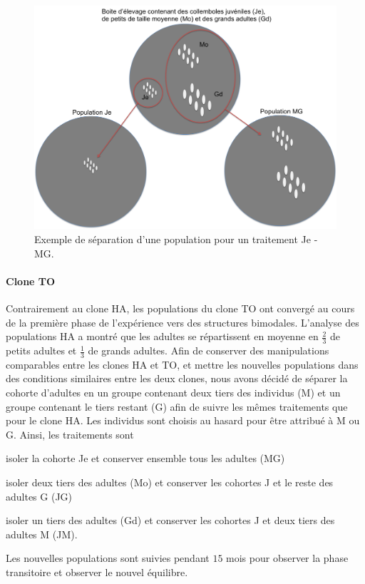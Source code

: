 \begin{figure}[!ht]
\begin{center}
\includegraphics[width=1\textwidth]{1_CorpsDeThese/Resumes/Fig/SM00}
\caption[Exemple de
séparation d'une population]{Exemple de
séparation d'une population pour un traitement Je - MG.}
\label{fig:SM0}
\end{center}
\end{figure}


\paragraph{Clone TO} Contrairement au clone HA, les populations du clone TO ont
convergé au cours de la première phase de l'expérience vers des structures
bimodales. L'analyse des populations HA a montré que les adultes se répartissent
en moyenne en $\frac{2}{3}$ de petits adultes et $\frac{1}{3}$ de grands
adultes. Afin de conserver des manipulations comparables entre les clones HA et
TO, et mettre les nouvelles populations dans des conditions similaires entre les
deux clones, nous avons décidé de séparer la cohorte d'adultes en un groupe
contenant deux tiers des individus (M) et un groupe contenant le tiers restant
(G) afin de suivre les mêmes traitements que pour le clone HA. Les individus
sont choisis au hasard pour être attribué à M ou G.
Ainsi, les traitements sont \begin{enumerate*}[label=(\roman*), before=\unskip{ : }, itemjoin={{ ; }},
itemjoin*={{ ; et }}]
\item isoler la cohorte Je et conserver ensemble tous les adultes (MG)
\item isoler deux tiers des adultes (Mo) et conserver les cohortes J et le reste
des adultes G (JG)
\item isoler un tiers des adultes (Gd) et conserver les cohortes J et deux tiers
des adultes M (JM).
\end{enumerate*} 
Les nouvelles populations sont suivies pendant $15$ mois pour observer la phase
transitoire et observer le nouvel équilibre. 

